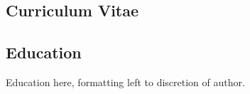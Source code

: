 \begin{titlepage}
\chapter*{Curriculum Vitae}
\nopagenumbers
\section*{Education}
Education here, formatting left to discretion of author.

\end{titlepage}
